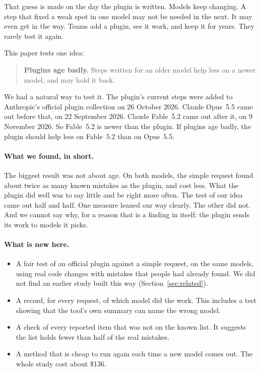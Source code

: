 \documentclass[11pt]{article}
\begin{document}
That guess is made on the day the plugin is written. Models keep changing. A step that fixed a weak spot in one model may not be needed in the next. It may even get in the way. Teams add a plugin, see it work, and keep it for years. They rarely test it again.

This paper tests one idea:

\begin{quote}
\textbf{Plugins age badly.} Steps written for an older model help less on a newer model, and may hold it back.
\end{quote}

We had a natural way to test it. The plugin's current steps were added to Anthropic's official plugin collection on 26 October 2026. Claude Opus~5.5 came out before that, on 22 September 2026. Claude Fable~5.2 came out after it, on 9 November 2026. So Fable~5.2 is newer than the plugin. If plugins age badly, the plugin should help less on Fable~5.2 than on Opus~5.5.

\paragraph{What we found, in short.} The biggest result was not about age. On both models, the simple request found about twice as many known mistakes as the plugin, and cost less. What the plugin did well was to say little and be right more often. The test of our idea came out half and half. One measure leaned our way clearly. The other did not. And we cannot say why, for a reason that is a finding in itself: the plugin sends its work to models it picks.

\paragraph{What is new here.}
\begin{itemize}
\item A fair test of an official plugin against a simple request, on the same models, using real code changes with mistakes that people had already found. We did not find an earlier study built this way (Section~\ref{sec:related}).
\item A record, for every request, of which model did the work. This includes a test showing that the tool's own summary can name the wrong model.
\item A check of every reported item that was not on the known list. It suggests the list holds fewer than half of the real mistakes.
\item A method that is cheap to run again each time a new model comes out. The whole study cost about \$136.
\end{itemize}
\end{document}
